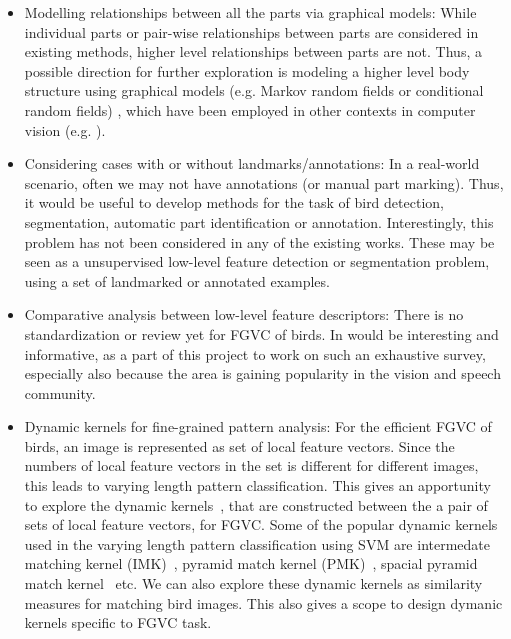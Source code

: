 \documentclass{article}
\begin{document}
\begin{itemize}
\item Modelling relationships between all the parts via graphical models: While
individual parts or pair-wise relationships between parts are considered in
existing methods, higher level relationships between parts are not.
Thus, a possible direction for further exploration is modeling a higher level
body structure using graphical models (e.g. Markov random fields or conditional
random fields) \cite{mrfbook,hmrf,mrf,crf,crf1}, which have been employed in 
other contexts in computer vision (e.g. \cite{mrfpose}). 

\item Considering cases with or without landmarks/annotations: In a real-world
scenario, often we may not have annotations (or manual part marking). Thus, it
would be useful to develop methods for the task of bird detection, segmentation,
automatic part identification or annotation. Interestingly, this problem has not
been considered in any of the existing works. These may be seen as a
unsupervised low-level feature detection or segmentation problem, using a set of
landmarked or annotated examples.

\item Comparative analysis between low-level feature descriptors: There is no
standardization or review yet for FGVC of birds. In would be interesting and
informative, as a part of this project to work on such an exhaustive survey,
especially also because the area is gaining popularity in the vision and speech
community.

\item Dynamic kernels for fine-grained pattern analysis: For the efficient FGVC
of birds, an image 
is represented as set of local feature vectors. Since the numbers of local
feature vectors in the set is different for different images, this leads to
varying length pattern classification. This gives an apportunity to explore the
dynamic kernels~\cite{DK_2003_MK_Wallraven}, that are constructed between the a
pair of sets of local feature vectors, for FGVC. Some of the popular dynamic
kernels used in the varying length pattern classification using SVM are
intermedate matching kernel (IMK)~\cite{IMK_2014_DAD_CC}, pyramid match kernel
(PMK)~\cite{PMK_2007_Grauman}, spacial pyramid match
kernel~\cite{SPMK_2006_Lazebnik} etc. We can also explore these dynamic kernels
as similarity measures for matching bird images. This also gives a scope to
design dymanic kernels specific to FGVC task. 
\end{itemize}
\end{document}
